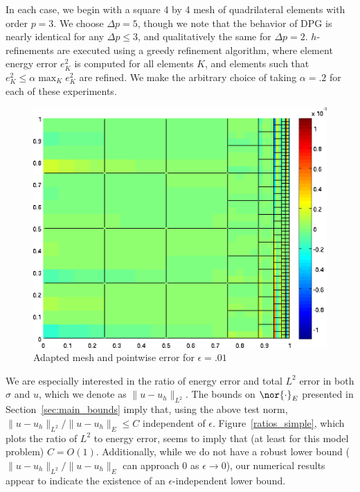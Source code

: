 In each case, we begin with a square 4 by 4 mesh of quadrilateral elements with order $p=3$.  We choose $\Delta p = 5$, though we note that the behavior of DPG is nearly identical for any $\Delta p \leq 3$, and qualitatively the same for $\Delta p = 2$.  $h$-refinements are executed using a greedy refinement algorithm, where element energy error $e_K^2$ is computed for all elements $K$, and elements such that $e_K^2 \leq \alpha \max_K e_K^2$ are refined.  We make the arbitrary choice of taking $\alpha = .2$ for each of these experiments.  

\begin{figure}[h!]
\centering
\includegraphics[scale=.4]{figs/u_pointdiff_wallBC.png}
\caption{Adapted mesh and pointwise error for $\epsilon=.01$}
\end{figure}
We are especially interested in the ratio of energy error and total $L^2$ error in both $\sigma$ and $u$, which we denote as $\|u-u_h\|_{L^2}$.  The bounds on $\nor{\cdot}_E$ presented in Section~\ref{sec:main_bounds} imply that, using the above test norm, $\|u-u_h\|_{L^2} / \|u-u_h\|_E \leq C$ independent of $\epsilon$.  Figure~\ref{ratios_simple}, which plots the ratio of $L^2$ to energy error, seems to imply that (at least for this model problem) $C=O(1)$.  Additionally, while we do not have a robust lower bound ($\|u-u_h\|_{L^2} / \|u-u_h\|_E$ can approach $0$ as $\epsilon \rightarrow 0$), our numerical results appear to indicate the existence of an $\epsilon$-independent lower bound. 

